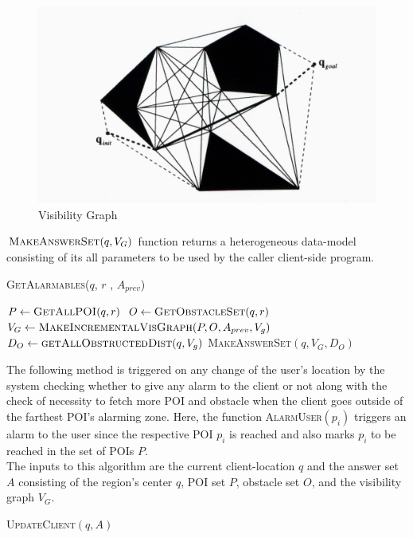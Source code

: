 \begin{figure}[h]
  \includegraphics[width=\linewidth]{visibility_graph.jpg}
  \caption{Visibility Graph}
  \label{fig:visgraph}
\end{figure}
\vspace{5pt}
$\textsc{MakeAnswerSet}(q, V_G)$ function returns a heterogeneous data-model consisting of its all parameters to be used by the caller client-side program.


\DontPrintSemicolon
\begin{algorithm}
\caption{\textsc{GetAlarmables}($q$, $r$ , $A_{prev}$)}
	
	 $P \gets \textsc{GetAllPOI}(q, r)$ \;
	 $O \gets \textsc{GetObstacleSet}(q, r)$ \;
	 $V_G \gets \textsc{MakeIncrementalVisGraph}(P, O, A_{prev},V_g)$ \;
	 $D_O \gets \textsc{getAllObstructedDist}( q, V_g )$
	\Return \textsc{MakeAnswerSet}$(q, V_G,D_O)$ \;
\label{GetAlarmables}
\end{algorithm}

The following method is triggered on any change of the user's location by the system checking whether to give any alarm to the client or not along with the check of necessity to fetch more POI and obstacle when the client goes outside of the farthest POI's alarming zone.
Here, the function \textsc{AlarmUser}$(p_i)$ triggers an alarm to the user since the respective POI $p_i$ is reached and also marks $p_i$ to be reached in the set of POIs $P$. \\
The inputs to this algorithm are the current client-location $q$ and the answer set $A$ consisting of the region's center $q$,%
POI set $P$, obstacle set $O$, and the visibility graph $V_G$.
\begin{algorithm}
\caption{\textsc{UpdateClient}$(q, A)$}

    
	  {
	}
\label{UpdateClient}
\end{algorithm}


